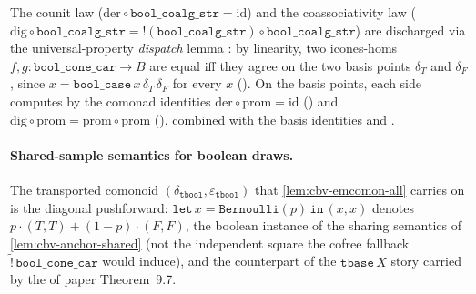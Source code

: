 \begin{lemma}\label{lem:cbv-bool-coalg-laws}
\rocqok
{}\rocqok
{}\rocqok
{}
The counit law
($\mathrm{der} \circ \mathtt{bool\_coalg\_str} = \mathrm{id}$) and the
coassociativity law
($\mathrm{dig} \circ \mathtt{bool\_coalg\_str} =
\mathord{!}(\mathtt{bool\_coalg\_str}) \circ \mathtt{bool\_coalg\_str}$)
are discharged via the universal-property \emph{dispatch} lemma
: by
linearity, two icones-homs $f, g : \mathtt{bool\_cone\_car} \to B$ are
equal iff they agree on the two basis points
$\delta_T$ and $\delta_F$, since
$x = \mathtt{bool\_case}\,x\,\delta_T\,\delta_F$ for every $x$
().
On the basis points, each side computes by the comonad identities
$\mathrm{der} \circ \mathrm{prom} = \mathrm{id}$
() and
$\mathrm{dig} \circ \mathrm{prom} = \mathrm{prom} \circ \mathrm{prom}$
(), combined with the basis identities
 and
.
\end{lemma}

\paragraph{Shared-sample semantics for boolean draws.}
The transported comonoid
$(\delta_{\mathtt{tbool}}, \varepsilon_{\mathtt{tbool}})$ that
\autoref{lem:cbv-emcomon-all} carries on
 is the
diagonal pushforward: $\mathtt{let}\,x = \mathtt{Bernoulli}(p)\,
\mathtt{in}\,(x, x)$ denotes $p \cdot (T, T) + (1 - p) \cdot (F, F)$,
the boolean instance of the sharing semantics of
\autoref{lem:cbv-anchor-shared} (not the independent square the cofree
fallback $\widetilde{\mathord{!}}\,\mathtt{bool\_cone\_car}$ would
induce), and the counterpart of the $\mathtt{tbase}\,X$ story carried
by the  of paper
Theorem~9.7.

